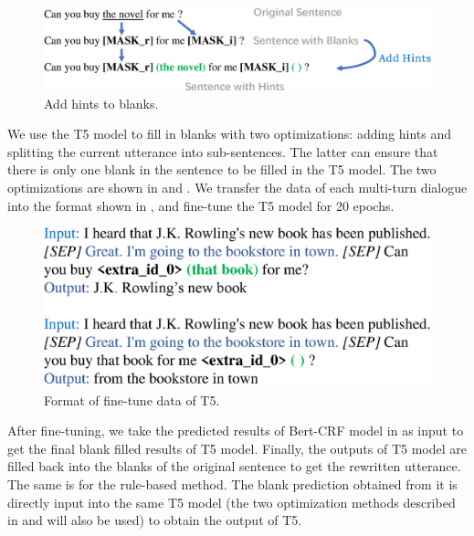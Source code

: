 \begin{figure}[th]
        \centering
        \includegraphics[width=1.0\columnwidth]{add-hint.eps}
        \caption{Add hints to blanks.}
        \label{fig:add-hint}
\end{figure}

We use the T5 model \citep{2020t5} to fill in blanks
with two optimizations: adding hints and splitting the current utterance into sub-sentences. 
The latter can ensure that there is only one blank in the sentence to be filled in the T5 model. The two optimizations are shown in  and . We transfer the data of each multi-turn dialogue into the format shown in , and fine-tune the T5 model for 20 epochs.

\begin{figure}[th]
        \centering
        \includegraphics[width=1.0\columnwidth]{T5-format.eps}
        \caption{Format of fine-tune data of T5.}
        \label{fig:T5-format}
\end{figure}

After fine-tuning, we take the predicted results of Bert-CRF model in  as input to get the final blank filled results of T5 model. Finally, the outputs of T5 model are filled back into the blanks of the original sentence to get the rewritten utterance. 
The same is for the rule-based method.
 The blank prediction obtained from it is directly input into the same T5 model (the two optimization methods described in  and  will also be used) to obtain the output of T5.
